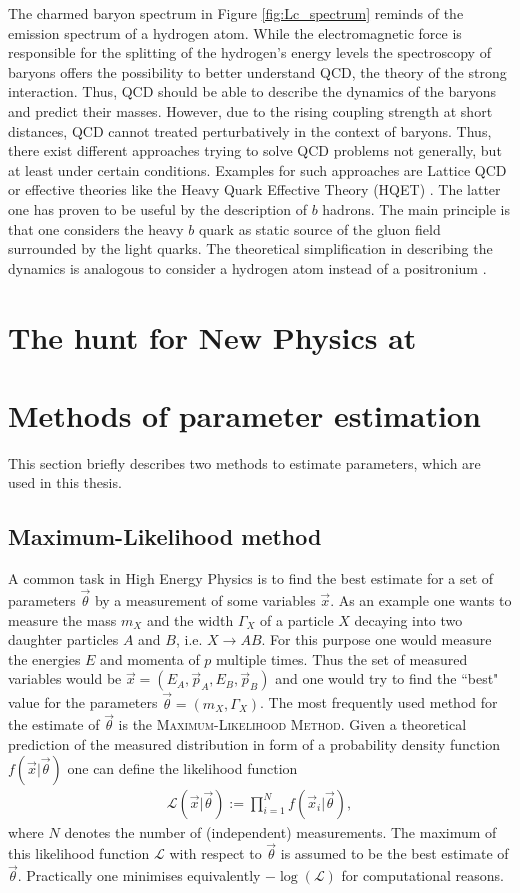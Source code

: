 The charmed baryon spectrum in Figure \ref{fig:Lc_spectrum} reminds of the emission spectrum of a hydrogen atom.
While the electromagnetic force is responsible for the splitting of the hydrogen's energy levels the spectroscopy of baryons offers the possibility to better understand QCD, the theory of the strong interaction.
Thus, QCD should be able to describe the dynamics of the baryons and predict their masses.
However, due to the rising coupling strength \as at short distances, QCD cannot treated perturbatively in the context of baryons.
Thus, there exist different approaches trying to solve QCD problems not generally, but at least under certain conditions.
Examples for such approaches are Lattice QCD \cite{LatticeQCD} or effective theories like the Heavy Quark Effective Theory (HQET) \cite{HQET_Introduction}.
The latter one has proven to be useful by the description of $b$ hadrons.
The main principle is that one considers the heavy $b$ quark as static source of the gluon field surrounded by the light quarks.
The theoretical simplification in describing the dynamics is analogous to consider a hydrogen atom instead of a positronium \cite{HQET_Introduction}.

\section{The hunt for New Physics at \lhcb}


\section{Methods of parameter estimation}
This section briefly describes two methods to estimate parameters, which are used in this thesis.

\subsection{Maximum-Likelihood method}
A common task in High Energy Physics is to find the best estimate for a set of parameters $\vec{\theta}$ by a measurement of some variables $\vec{x}$.
As an example one wants to measure the mass $m_X$  and the width $\Gamma_X$ of a particle $X$ decaying into two daughter particles $A$ and $B$, i.e. $X \to AB$.
For this purpose one would measure the energies $E$ and momenta of $p$ multiple times.
Thus the set of measured variables would be $\vec{x} = (E_A, \vec{p}_A, E_B, \vec{p}_B)$ and one would try to find the ``best" value for the parameters $\vec{\theta} = (m_X, \Gamma_X)$. 
The most frequently used method for the estimate of $\vec{\theta}$ is the \textsc{Maximum-Likelihood Method}.
Given a theoretical prediction of the measured distribution in form of a probability density function $f(\vec{x}|\vec{\theta})$ one can define the likelihood function
\begin{align}
    \mathcal{L}(\vec{x}|\vec{\theta}) := \prod_{i=1}^{N} f(\vec{x}_i|\vec{\theta}),
\end{align}
where $N$ denotes the number of (independent) measurements.
The maximum of this likelihood function $\mathcal{L}$ with respect to $\vec{\theta}$ is assumed to be the best estimate of $\vec{\theta}$.
Practically one minimises equivalently $-\log(\mathcal{L})$ for computational reasons.

